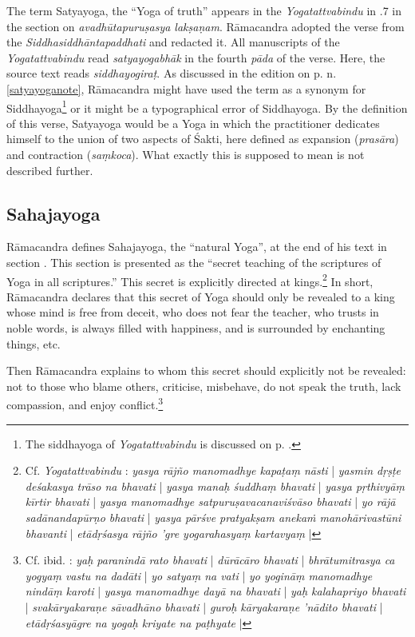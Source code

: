 The term Satyayoga, the ``Yoga of truth'' appears in the \emph{Yogatattvabindu} in .7 in the section on \textit{avadhūtapuruṣasya lakṣaṇam}. Rāmacandra adopted the verse from the \emph{Siddhasiddhāntapaddhati} and redacted it. All manuscripts of the \emph{Yogatattvabindu} read \textit{satyayogabhāk} in the fourth \textit{pāda} of the verse. Here, the source text reads \textit{siddhayogiraṭ}. As discussed in the edition on p. \pageref{satyayoganote} n. \ref{satyayoganote}, Rāmacandra might have used the term as a synonym for Siddhayoga\footnote{The siddhayoga of \textit{Yogatattvabindu} is discussed on p. \pageref{siddhayogaintro}.} or it might be a typographical error of Siddhayoga. By the definition of this verse, Satyayoga would be a Yoga in which the practitioner dedicates himself to the union of two aspects of Śakti, here defined as expansion (\textit{prasāra}) and contraction (\textit{saṃkoca}). What exactly this is supposed to mean is not described further. 

\subsection{Sahajayoga}
\label{sahajayoga}

Rāmacandra defines Sahajayoga, the ``natural Yoga'', at the end of his text in section . This section is presented as the ``secret teaching of the scriptures of Yoga in all scriptures.'' This secret is explicitly directed at kings.\footnote{Cf. \emph{Yogatattvabindu} : \textit{yasya rājño manomadhye kapaṭaṃ nāsti} | \textit{yasmin dṛṣṭe deśakasya trāso na bhavati} | \textit{yasya manaḥ śuddhaṃ bhavati} | \textit{yasya pṛthivyāṃ kīrtir bhavati} | \textit{yasya manomadhye satpuruṣavacanaviśvāso bhavati} | \textit{yo rājā sadānandapūrṇo bhavati} | \textit{yasya pārśve pratyakṣam anekaṁ manohārivastūni bhavanti} | \textit{etādṛśasya rājño 'gre yogarahasyaṃ kartavyaṃ} |} In short, Rāmacandra declares that this secret of Yoga should only be revealed to a king whose mind is free from deceit, who does not fear the teacher, who trusts in noble words, is always filled with happiness, and is surrounded by enchanting things, etc.

Then Rāmacandra explains to whom this secret should explicitly not be revealed: not to those who blame others, criticise, misbehave, do not speak the truth, lack compassion, and enjoy conflict.\footnote{Cf. ibid. : \textit{yaḥ paranindā rato bhavati} | \textit{dūrācāro bhavati} | \textit{bhrātumitrasya ca yogyaṃ vastu na dadāti} | \textit{yo satyaṃ na vati} | \textit{yo yogināṃ manomadhye nindāṃ karoti} | \textit{yasya manomadhye dayā na bhavati} | \textit{yaḥ kalahapriyo bhavati} | \textit{svakāryakaraṇe sāvadhāno bhavati} | \textit{guroḥ kāryakaraṇe 'nādito bhavati} | \textit{etādṛśasyāgre na yogaḥ kriyate na paṭhyate} |}

